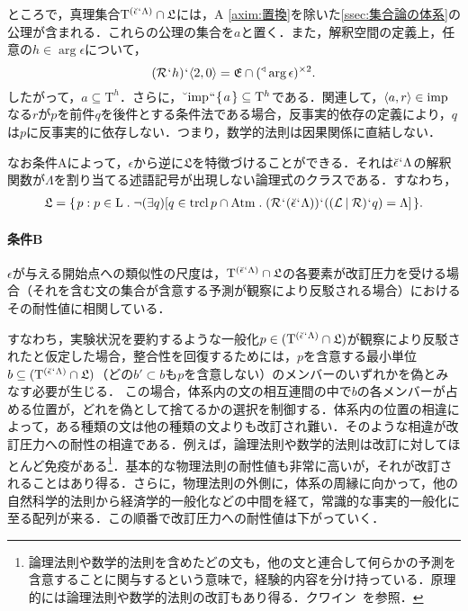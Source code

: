 ところで，真理集合$ \mathrm{T}^{(\breve{\epsilon}{\mspace{1mu}{`}\mspace{1mu}} \Lambda)}\cap \mathfrak{L} $には，A \ref{axim:置換}を除いた\ref{ssec:集合論の体系}の公理が含まれる．これらの公理の集合を$a$と置く．また，解釈空間の定義上，任意の$h\in\arg\epsilon$について，
\[
    (\mathcal{R}{\mspace{1mu}{`}\mspace{1mu}} h){\mspace{1mu}{`}\mspace{1mu}}\langle 2,0 \rangle=\mathfrak{E}\cap({^\triangleleft}\arg\epsilon)^{\times 2}.
\]
したがって，$ a\subseteq\mathrm{T}^h $．さらに，$ \breve{\:\:}\mathrm{imp}{\mspace{1mu}{``}\mspace{1mu}}\{\mspace{2mu}a\mspace{2mu}\}\subseteq\mathrm{T}^h $である．関連して，$ \langle a,r \rangle\in\mathrm{imp} $なる$r$が$p$を前件$q$を後件とする条件法である場合，反事実的依存の定義により，$q$は$p$に反事実的に依存しない．つまり，数学的法則は因果関係に直結しない．

なお条件Aによって，$\epsilon$から逆に$ \mathfrak{L} $を特徴づけることができる．それは$\breve{\epsilon}{\mspace{1mu}{`}\mspace{1mu}}\Lambda$の解釈関数が$\Lambda$を割り当てる述語記号が出現しない論理式のクラスである．すなわち，
\begin{align*}
\mathfrak{L} = \classab{p:p\in\mathrm{L}\con{1}
\neg(\exists q)[
    q\in \mathrm{trcl}\,p\cap\mathrm{Atm}\con{1}(\mathcal{R}\fap(\breve{\epsilon}\fap \Lambda))\fap((\mathcal{L}\resl\mathcal{R})\fap q) = \Lambda
]}.
\end{align*}

\paragraph{条件B}$\epsilon$が与える開始点への類似性の尺度は，$ \mathrm{T}^{(\breve{\epsilon}{\mspace{1mu}{`}\mspace{1mu}} \Lambda)}\cap \mathfrak{L} $の各要素が改訂圧力を受ける場合（それを含む文の集合が含意する予測が観察により反駁される場合）におけるその耐性値に相関している．

すなわち，実験状況を要約するような一般化$p\in(\mathrm{T}^{(\breve{\epsilon}{\mspace{1mu}{`}\mspace{1mu}} \Lambda)}\cap \mathfrak{L})$が観察により反駁されたと仮定した場合，整合性を回復するためには，$p$を含意する最小単位$b\subseteq (\mathrm{T}^{(\breve{\epsilon}{\mspace{1mu}{`}\mspace{1mu}} \Lambda)}\cap \mathfrak{L})$（どの$b'\subset b$も$p$を含意しない）のメンバーのいずれかを偽とみなす必要が生じる．
この場合，体系内の文の相互連間の中で$b$の各メンバーが占める位置が，どれを偽として捨てるかの選択を制御する．体系内の位置の相違によって，ある種類の文は他の種類の文よりも改訂され難い．そのような相違が改訂圧力への耐性の相違である．例えば，論理法則や数学的法則は改訂に対してほとんど免疫がある\footnote{
    論理法則や数学的法則を含めたどの文も，他の文と連合して何らかの予測を含意することに関与するという意味で，経験的内容を分け持っている．原理的には論理法則や数学的法則の改訂もあり得る．クワイン~\cite[pp.\,2--4]{クワインb}を参照．
}．基本的な物理法則の耐性値も非常に高いが，それが改訂されることはあり得る．さらに，物理法則の外側に，体系の周縁に向かって，他の自然科学的法則から経済学的一般化などの中間を経て，常識的な事実的一般化に至る配列が来る．この順番で改訂圧力への耐性値は下がっていく．


